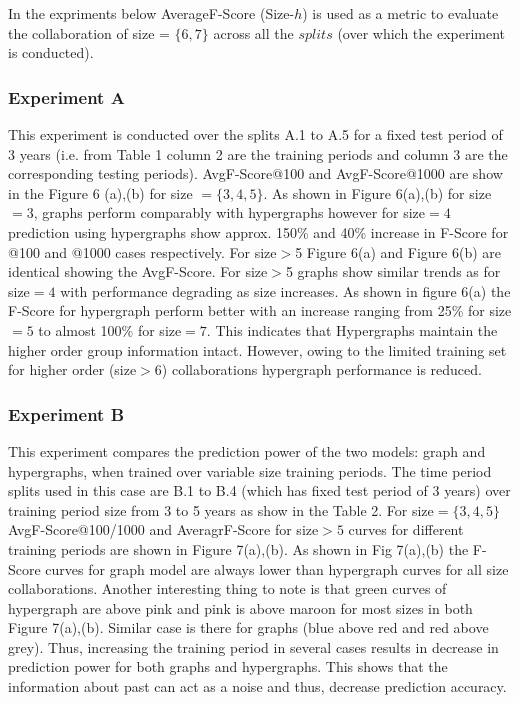 \documentclass[twoside,leqno,twocolumn]{article}
\begin{document}
In the expriments below AverageF-Score (Size-$h$) is used as a metric to evaluate the collaboration of size = $\{6,7\}$ across all the $splits$ (over which the experiment is conducted).

\subsubsection{Experiment A}

This experiment is conducted over the splits A.1 to A.5 for a fixed test period of 3 years (i.e. from Table 1 column 2 are the training periods and column 3 are the corresponding testing periods). AvgF-Score@100 and AvgF-Score@1000 are show in the Figure 6 (a),(b) for size $= \{3,4,5\}$. As shown in Figure 6(a),(b) for size$=3$, graphs perform comparably with hypergraphs however for size$=4$ prediction using hypergraphs show approx. 150\% and 40\% increase in F-Score for @100 and @1000 cases respectively. For size$>$5 Figure 6(a) and Figure 6(b) are identical showing the AvgF-Score. For size$>$5 graphs show similar trends as for size$=4$ with performance degrading as size increases. As shown in figure 6(a) the F-Score for hypergraph perform better with an increase ranging from 25\% for size$=5$ to almost 100\% for size$=7$. This indicates that Hypergraphs maintain the higher order group information intact. However, owing to the limited training set for higher order (size$>6$) collaborations hypergraph performance is reduced. 

\subsubsection{Experiment B}

This experiment compares the prediction power of the two models: graph and hypergraphs, when trained over variable size training periods. The time period splits used in this case are B.1 to B.4 (which has fixed test period of 3 years) over training period size from 3 to 5 years as show in the Table 2. For size$=\{3,4,5\}$ AvgF-Score@100/1000 and AveragrF-Score for size$>5$ curves for different training periods are shown in Figure 7(a),(b). As shown in Fig 7(a),(b) the F-Score curves for graph model are always lower than hypergraph curves for all size collaborations. Another interesting thing to note is that green curves of hypergraph are above pink and pink is above maroon for most sizes in both Figure 7(a),(b). Similar case is there for graphs (blue above red and red above grey). Thus, increasing the training period in several cases results in decrease in prediction power for both graphs and hypergraphs. This shows that the information about past can act as a noise and thus, decrease prediction accuracy.
\end{document}
